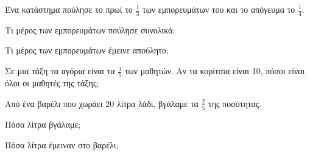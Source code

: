 \documentclass[11pt,a4paper,modern]{FFExercises}
\begin{document}
    \askhsh Ένα κατάστημα πούλησε το πρωί το $\frac{1}{3}$ των εμπορευμάτων του και το απόγευμα το $\frac{1}{4}$.
    \begin{alist}
        \item Τι μέρος των εμπορευμάτων πούλησε συνολικά;
        \item Τι μέρος των εμπορευμάτων έμεινε απούλητο;
    \end{alist}

    \askhsh Σε μια τάξη τα αγόρια είναι τα $\frac{3}{5}$ των μαθητών. Αν τα κορίτσια είναι 10, πόσοι είναι όλοι οι μαθητές της τάξης;

    \askhsh Από ένα βαρέλι που χωράει 20 λίτρα λάδι, βγάλαμε τα $\frac{2}{5}$ της ποσότητας.
    \begin{alist}
        \item Πόσα λίτρα βγάλαμε;
        \item Πόσα λίτρα έμειναν στο βαρέλι;
    \end{alist}
\end{document}
